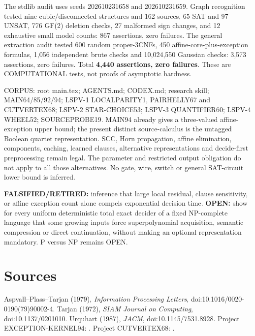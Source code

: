 \documentclass[11pt]{article}
\begin{document}
The stdlib audit uses seeds 202610231658 and 202610231659. Graph recognition tested nine cubic/disconnected structures and 162 sources, 65 SAT and 97 UNSAT, 776 GF(2) deletion checks, 27 malformed sign changes, and 12 exhaustive small model counts: 867 assertions, zero failures. The general extraction audit tested 600 random proper-3CNFs, 450 affine-core-plus-exception formulas, 1,056 independent brute checks and 10,024,550 Gaussian checks: 3,573 assertions, zero failures. Total \textbf{4,440 assertions, zero failures}. These are COMPUTATIONAL tests, not proofs of asymptotic hardness.

CORPUS: root main.tex; AGENTS.md; CODEX.md; research skill; MAIN64/85/92/94; LSPV-1 LOCALPARITY1, PAIRHELLY67 and CUTVERTEX68; LSPV-2 STAR-CHOICE53; LSPV-3 QUANTIFIER60; LSPV-4 WHEEL52; SOURCEPROBE19. MAIN94 already gives a three-valued affine-exception upper bound; the present distinct source-calculus is the untagged Boolean quartet representation. SCC, Horn propagation, affine elimination, components, caching, learned clauses, alternative representations and decide-first preprocessing remain legal. The parameter and restricted output obligation do not apply to all those alternatives. No gate, wire, switch or general SAT-circuit lower bound is inferred.

\textbf{FALSIFIED/RETIRED:} inference that large local residual, clause sensitivity, or affine exception count alone compels exponential decision time. \textbf{OPEN:} show for every uniform deterministic total exact decider of a fixed NP-complete language that some growing inputs force superpolynomial acquisition, semantic compression or direct continuation, without making an optional representation mandatory. P versus NP remains OPEN.

\section{Sources}
Aspvall--Plass--Tarjan (1979), \emph{Information Processing Letters}, doi:10.1016/0020-0190(79)90002-4.
Tarjan (1972), \emph{SIAM Journal on Computing}, doi:10.1137/0201010.
Urquhart (1987), \emph{JACM}, doi:10.1145/7531.8928.
Project EXCEPTION-KERNEL94: .
Project CUTVERTEX68: .
\end{document}

